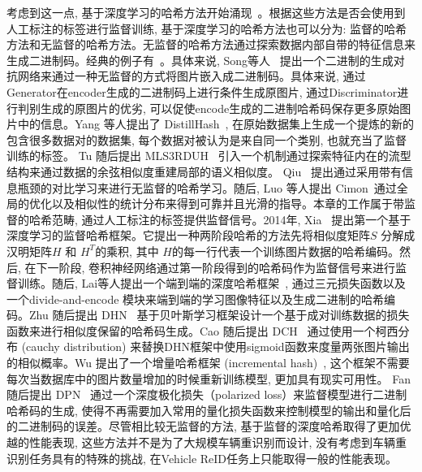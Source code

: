 考虑到这一点, 基于深度学习的哈希方法开始涌现~\cite{cao2017hashnet, fan2020deep, li2015feature, zhu2016deep, liu2016deep}。根据这些方法是否会使用到人工标注的标签进行监督训练, 基于深度学习的哈希方法也可以分为: 监督的哈希方法和无监督的哈希方法。无监督的哈希方法通过探索数据内部自带的特征信息来生成二进制码。经典的例子有~\cite{song2018binary, yang2019distillhash, tu2020mls3rduh, qiu2021unsupervised, luo2020cimon}。具体来说, Song等人~\cite{song2018binary} 提出一个二进制的生成对抗网络来通过一种无监督的方式将图片嵌入成二进制码。具体来说, 通过Generator在encoder生成的二进制码上进行条件生成原图片, 通过Discriminator进行判别生成的原图片的优劣, 可以促使encode生成的二进制哈希码保存更多原始图片中的信息。Yang 等人提出了 DistillHash~\cite{yang2019distillhash}, 在原始数据集上生成一个提炼的新的包含很多数据对的数据集, 每个数据对被认为是来自同一个类别, 也就充当了监督训练的标签。 Tu 随后提出 MLS3RDUH~\cite{tu2020mls3rduh}  引入一个机制通过探索特征内在的流型结构来通过数据的余弦相似度重建局部的语义相似度。 Qiu ~\cite{qiu2021unsupervised}提出通过采用带有信息瓶颈的对比学习来进行无监督的哈希学习。随后, Luo 等人提出 Cimon~\cite{luo2020cimon}通过全局的优化以及相似性的统计分布来得到可靠并且光滑的指导。本章的工作属于带监督的哈希范畴, 通过人工标注的标签提供监督信号。2014年, Xia~\cite{xia2014supervised} 提出第一个基于深度学习的监督哈希框架。它提出一种两阶段哈希的方法先将相似度矩阵$S$ 分解成汉明矩阵$H$ 和 $H^T$的乘积, 其中 $H$的每一行代表一个训练图片数据的哈希编码。然后, 在下一阶段, 卷积神经网络通过第一阶段得到的哈希码作为监督信号来进行监督训练。随后, Lai等人提出一个端到端的深度哈希框架~\cite{lai2015simultaneous}, 通过三元损失函数以及一个divide-and-encode 模块来端到端的学习图像特征以及生成二进制的哈希编码。Zhu 随后提出 DHN~\cite{zhu2016deep} 基于贝叶斯学习框架设计一个基于成对训练数据的损失函数来进行相似度保留的哈希码生成。Cao 随后提出 DCH~\cite{cao2018deep} 通过使用一个柯西分布 (cauchy distribution) 来替换DHN框架中使用sigmoid函数来度量两张图片输出的相似概率。Wu 提出了一个增量哈希框架 (incremental hash)~\cite{wu2019deep}, 这个框架不需要每次当数据库中的图片数量增加的时候重新训练模型, 更加具有现实可用性。 Fan 随后提出 DPN~\cite{fan2020deep} 通过一个深度极化损失（polarized loss）来监督模型进行二进制哈希码的生成, 使得不再需要加入常用的量化损失函数来控制模型的输出和量化后的二进制码的误差。尽管相比较无监督的方法, 基于监督的深度哈希取得了更加优越的性能表现, 这些方法并不是为了大规模车辆重识别而设计, 没有考虑到车辆重识别任务具有的特殊的挑战, 在Vehicle ReID任务上只能取得一般的性能表现。 \par
